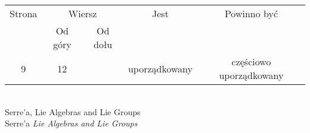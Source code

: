 \documentclass[a4paper,11pt]{article}
\numberwithin{equation}{section}
\begin{document}





\newpage



\begin{center}

  \begin{tabular}{|c|c|c|c|c|}
    \hline
    Strona & \multicolumn{2}{c|}{Wiersz} & Jest
                              & Powinno być \\ \cline{2-3}
    & Od góry & Od dołu & & \\
    \hline
    9 & 12 & & uporządkowany & częściowo uporządkowany \\
    \hline
  \end{tabular}

\end{center}

\VerSpaceSix



\noindent
{} \\
\Jest Serre’a, Lie Algebras and Lie Groups \\
\PowinnoByc Serre’a \textit{Lie Algebras and Lie Groups} \\
\end{document}
